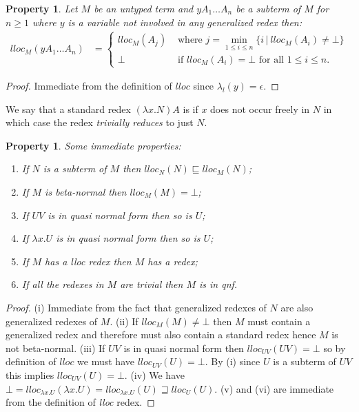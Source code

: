 \documentclass{elsarticle}
\theoremstyle{plain}
\newtheorem{property}[theorem]{Property}
\theoremstyle{definition}
\begin{document}
\begin{property}
\label{prop:qnf_longapply}
    Let $M$ be an untyped term and $y A_1 \ldots A_n$ be a subterm of $M$ for $n\geq1$ where $y$ is a variable not involved in any generalized redex then:
    \begin{align*}
    lloc_M(y A_1 \ldots A_n) &=
        \begin{cases}
         lloc_M (A_j) &\mbox{ where } j = \min_{1\leq i\leq n} \{ i\, | \ lloc_M (A_i) \neq \bot\} \\
         \bot &\mbox{ if } lloc_M(A_i) = \bot \mbox{ for all } 1\leq i\leq n.
        \end{cases}
    \end{align*}
\end{property}
\begin{proof}
    Immediate from the definition of $lloc$ since $\lambda_l(y) = \epsilon$.
\end{proof}

We say that a standard redex $(\lambda x. N) A$ is  if $x$ does not occur freely in $N$ in which case the redex \emph{trivially reduces} to just $N$.

\begin{property}
\label{prop:lloc_properties}
Some immediate properties:
\begin{enumerate}[noitemsep,label=(\roman*)]
\item
 If $N$ is a subterm of $M$ then $lloc_N(N) \sqsubseteq lloc_M(N)$;
\item
 If $M$ is beta-normal then $lloc_M(M) = \bot$;
 \item
 If $U V$ is in quasi normal form then so is $U$;
\item
 If $\lambda x . U$ is in quasi normal form then so is $U$;
 \item If $M$ has a \emph{lloc} redex then $M$ has a redex;
 \item If all the redexes in $M$ are trivial then $M$ is in \emph{qnf}.
\end{enumerate}
\end{property}
\begin{proof}
(i) Immediate from the fact that generalized redexes of $N$ are also generalized redexes of $M$. (ii) If $lloc_M(M) \neq \bot$ then $M$ must contain a generalized redex and therefore must also contain a standard redex hence $M$ is not beta-normal.
(iii) If $U V$ is in quasi normal form then $lloc_{UV}(UV) = \bot$ so by definition of $lloc$ we must have $lloc_{UV}(U) = \bot$. By (i) since $U$ is a subterm of $UV$ this implies $lloc_{UV}(U) = \bot$.
(iv) We have $\bot = lloc_{\lambda x . U}(\lambda x . U) = lloc_{\lambda x . U}(U) \sqsupseteq lloc_{U}(U)$.
(v) and (vi) are immediate from the definition of \emph{lloc} redex.
\end{proof}
\end{document}
